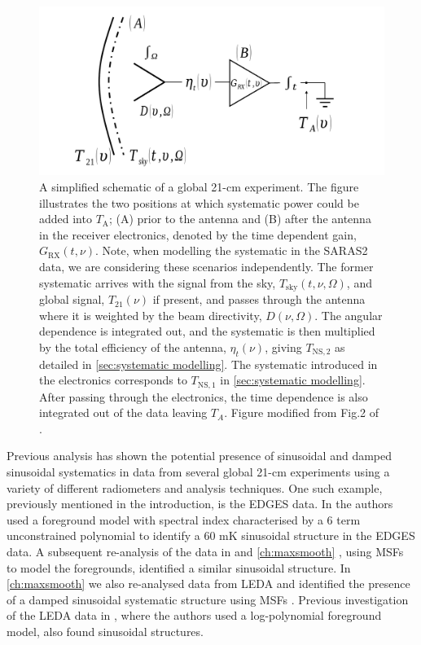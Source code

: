 \begin{figure}
    \centering
    \includegraphics[width=\linewidth]{saras2/figs/SARASRadiometerDiagram.pdf}
    \caption{A simplified schematic of a global 21-cm experiment. The figure illustrates the two positions at which systematic power could be added into $T_\mathrm{A}$; (A) prior to the antenna and (B) after the antenna in the receiver electronics, denoted by the time dependent gain, $G_\mathrm{RX}(t, \nu)$. Note, when modelling the systematic in the SARAS2 data, we are considering these scenarios independently. The former systematic arrives with the signal from the sky, $T_\mathrm{sky}(t, \nu, \Omega)$, and global signal, $T_{21}(\nu)$ if present, and passes through the antenna where it is weighted by the beam directivity, $D(\nu, \Omega)$. The angular dependence is integrated out, and the systematic is then multiplied by the total efficiency of the antenna, $\eta_t(\nu)$, giving $T_\mathrm{NS,2}$ as detailed in \cref{sec:systematic modelling}. The systematic introduced in the electronics corresponds to $T_\mathrm{NS,1}$ in \cref{sec:systematic modelling}. After passing through the electronics, the time dependence is also integrated out of the data leaving $T_A$. Figure modified from Fig.2 of \protect\cite{Cumner_antenna_2021}.}
    \label{fig:radiometer}
\end{figure}

Previous analysis has shown the potential presence of sinusoidal and damped sinusoidal systematics in data from several global 21-cm experiments using a variety of different radiometers and analysis techniques. One such example, previously mentioned in the introduction, is the EDGES data. In \cite{Hills2018} the authors used a foreground model with spectral index characterised by a 6 term unconstrained polynomial to identify a 60 mK sinusoidal structure in the EDGES data. A subsequent re-analysis of the data in \cite{Singh_edges_2019} and \cref{ch:maxsmooth} \cite{Bevins_maxsmooth_2021}, using MSFs to model the foregrounds, identified a similar sinusoidal structure. In \cref{ch:maxsmooth} we also re-analysed data from LEDA and identified the presence of a damped sinusoidal systematic structure using MSFs \cite{Bevins_maxsmooth_2021}. Previous investigation of the LEDA data in \cite{Price_LEDA_2018}, where the authors used a log-polynomial foreground model, also found sinusoidal structures.

